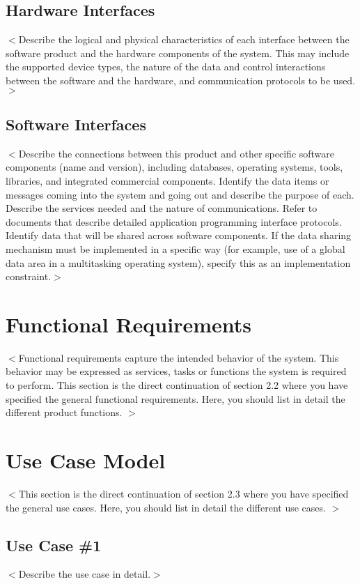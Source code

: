 \documentclass[a4paper, 11pt]{scrreprt}
\begin{document}
\subsection{Hardware Interfaces}
$<$Describe the logical and physical characteristics of each interface between 
the software product and the hardware components of the system. This may include 
the supported device types, the nature of the data and control interactions 
between the software and the hardware, and communication protocols to be 
used.$>$

\subsection{Software Interfaces}
$<$Describe the connections between this product and other specific software 
components (name and version), including databases, operating systems, tools, 
libraries, and integrated commercial components. Identify the data items or 
messages coming into the system and going out and describe the purpose of each.  
Describe the services needed and the nature of communications. Refer to 
documents that describe detailed application programming interface protocols.  
Identify data that will be shared across software components. If the data 
sharing mechanism must be implemented in a specific way (for example, use of a 
global data area in a multitasking operating system), specify this as an 
implementation constraint.$>$

\section{Functional Requirements}
$<$Functional requirements capture the intended behavior of the system. This 
behavior may be expressed as services, tasks or functions the system is required 
to perform. This section is the direct continuation of section 2.2 where you have 
specified the general functional requirements. Here, you should list in detail the
different product functions. $>$

\section{Use Case Model}
$<$This section is the direct continuation of section 2.3 where you have specified 
the general use cases. Here, you should list in detail the different use cases. 
$>$
\subsection{Use Case \#1}
$<$Describe the use case in detail.$>$
\end{document}
